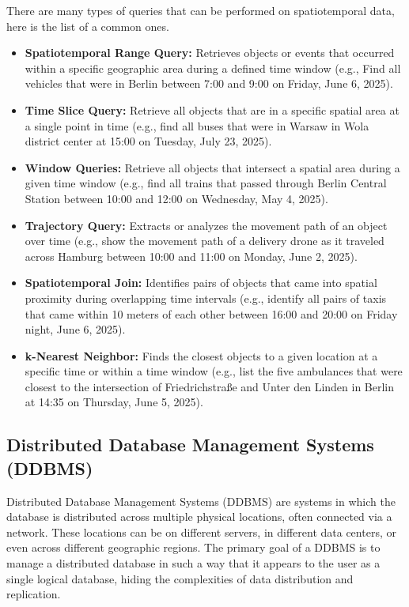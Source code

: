 There are many types of queries that can be performed on spatiotemporal data, here is the list of a common ones.
\begin{itemize}
	\item \textbf{Spatiotemporal Range Query:} Retrieves objects or events that occurred within a specific geographic area during a defined time window
		(e.g., Find all vehicles that were in Berlin between 7:00 and 9:00 on Friday, June 6, 2025).

	\item \textbf{Time Slice Query:} Retrieve all objects that are in a specific spatial area at a single point in time
		(e.g., find all buses that were in Warsaw in Wola district center at 15:00 on Tuesday, July 23, 2025).

	\item \textbf{Window Queries:} Retrieve all objects that intersect a spatial area during a given time window
		(e.g., find all trains that passed through Berlin Central Station between 10:00 and 12:00 on Wednesday, May 4, 2025).

	\item \textbf{Trajectory Query:} Extracts or analyzes the movement path of an object over time
		(e.g., show the movement path of a delivery drone as it traveled across Hamburg between 10:00 and 11:00 on Monday, June 2, 2025).

	\item \textbf{Spatiotemporal Join:} Identifies pairs of objects that came into spatial proximity during overlapping time intervals
		(e.g., identify all pairs of taxis that came within 10 meters of each other between 16:00 and 20:00 on Friday night, June 6, 2025).

	\item \textbf{k-Nearest Neighbor:} Finds the closest objects to a given location at a specific time or within a time window
		(e.g., list the five ambulances that were closest to the intersection of Friedrichstraße and Unter den Linden in Berlin at 14:35 on Thursday, June 5, 2025).
\end{itemize}

\subsection{Distributed Database Management Systems (DDBMS)}
Distributed Database Management Systems (DDBMS) are systems in which the database is distributed across multiple physical locations, often connected via a network.
These locations can be on different servers, in different data centers, or even across different geographic regions.
The primary goal of a DDBMS is to manage a distributed database in such a way that it appears to the user as a single logical database, hiding the complexities of data distribution and replication.
\cite{ozsuDistributedParallelDatabase1996}

